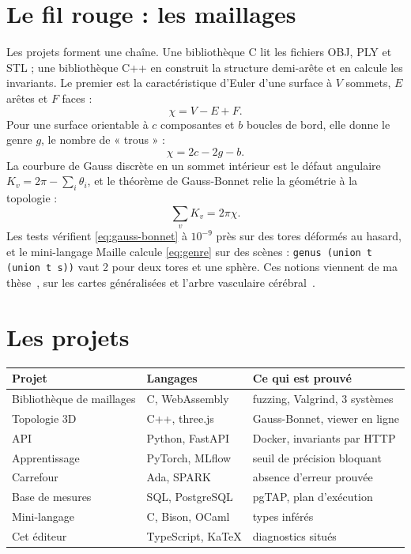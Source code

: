 \documentclass{article}
\begin{document}
\section{Le fil rouge : les maillages}\label{sec:maillages}
Les projets forment une chaîne. Une bibliothèque C lit les fichiers OBJ, PLY et STL ; une bibliothèque
C++ en construit la structure demi-arête et en calcule les invariants. Le premier est la
caractéristique d'Euler d'une surface à $V$ sommets, $E$ arêtes et $F$ faces :
\begin{equation}
\chi = V - E + F. \label{eq:euler}
\end{equation}
Pour une surface orientable à $c$ composantes et $b$ boucles de bord, elle donne le genre $g$, le
nombre de « trous » :
\begin{equation}
\chi = 2c - 2g - b. \label{eq:genre}
\end{equation}
La courbure de Gauss discrète en un sommet intérieur est le défaut angulaire
$K_v = 2\pi - \sum_i \theta_i$, et le théorème de Gauss-Bonnet relie la géométrie à la topologie :
\begin{equation}
\sum_v K_v = 2\pi\chi. \label{eq:gauss-bonnet}
\end{equation}
Les tests vérifient \eqref{eq:gauss-bonnet} à $10^{-9}$ près sur des tores déformés au hasard, et le
mini-langage Maille calcule \eqref{eq:genre} sur des scènes : \texttt{genus (union t (union t s))}
vaut 2 pour deux tores et une sphère. Ces notions viennent de ma thèse~\cite{these}, sur les
cartes généralisées et l'arbre vasculaire cérébral~\cite{wscg}.

\section{Les projets}\label{sec:projets}
\begin{tabular}{lll}
\hline
\textbf{Projet} & \textbf{Langages} & \textbf{Ce qui est prouvé} \\
\hline
Bibliothèque de maillages & C, WebAssembly & fuzzing, Valgrind, 3 systèmes \\
Topologie 3D & C++, three.js & Gauss-Bonnet, viewer en ligne \\
API & Python, FastAPI & Docker, invariants par HTTP \\
Apprentissage & PyTorch, MLflow & seuil de précision bloquant \\
Carrefour & Ada, SPARK & absence d'erreur prouvée \\
Base de mesures & SQL, PostgreSQL & pgTAP, plan d'exécution \\
Mini-langage & C, Bison, OCaml & types inférés \\
Cet éditeur & TypeScript, KaTeX & diagnostics situés \\
\hline
\end{tabular}
\end{document}
